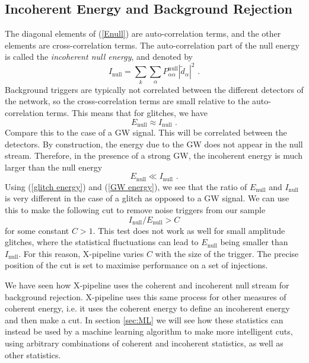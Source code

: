 \documentclass[11pt]{cuthesis}
\newcommand{\fs}{\text{ .}}
\newcommand{\xp}{X-pipeline }
\begin{document}
\subsection{Incoherent Energy and Background Rejection} \label{sec:xcuts}
The diagonal elements of (\ref{Enull}) are auto-correlation terms, and the other elements are cross-correlation terms. The auto-correlation part of the null energy is called the \textit{incoherent null energy}, and denoted by
\begin{equation}
I_\text{null} = \sum_k \sum_\alpha P^\text{null}_{\alpha \alpha} | \tilde{d}_\alpha |^2 \fs
\end{equation}
Background triggers are typically not correlated between the different detectors of the network, so the cross-correlation terms are small relative to the auto-correlation terms. This means that for glitches, we have
\begin{equation} \label{glitch energy}
E_\text{null} \approx I_\text{null} \fs
\end{equation} 
Compare this to the case of a GW signal. This will be correlated between the detectors. By construction, the energy due to the GW does not appear in the null stream. Therefore, in the presence of a strong GW, the incoherent energy is much larger than the null energy 
\begin{equation} \label{GW energy}
E_\text{null} \ll I_\text{null} \fs
\end{equation}
Using (\ref{glitch energy}) and (\ref{GW energy}), we see that the ratio of $E_\text{null}$ and $I_\text{null}$ is very different in the case of a glitch as opposed to a GW signal. We can use this to make the following cut to remove noise triggers from our sample
\begin{equation} \label{cut}
I_\text{null} / E_\text{null} > C
\end{equation}
for some constant $C>1$. This test does not work as well for small amplitude glitches, where the statistical fluctuations can lead to $E_\text{null}$ being smaller than $I_\text{null}$. For this reason, \xp varies $C$ with the size of the trigger. The precise position of the cut is set to maximise performance on a set of injections.

We have seen how \xp uses the coherent and incoherent null stream for background rejection. \xp uses this same process for other measures of coherent energy, i.e. it uses the coherent energy to define an incoherent energy and then make a cut. In section \ref{sec:ML} we will see how these statistics can instead be used by a machine learning algorithm to make more intelligent cuts, using arbitrary combinations of coherent and incoherent statistics, as well as other statistics. 
\end{document}
